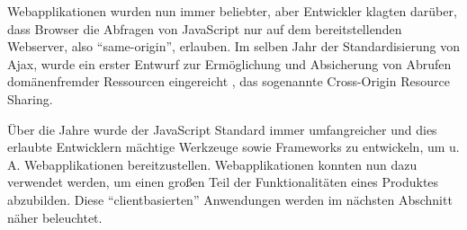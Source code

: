 Webapplikationen wurden nun immer beliebter, aber Entwickler klagten darüber, dass Browser die Abfragen von JavaScript nur auf dem bereitstellenden Webserver, also \enquote{same-origin}, erlauben\cite{CrossSiteXHRWithCORS}. Im selben Jahr der Standardisierung von Ajax, wurde ein erster Entwurf zur Ermöglichung und Absicherung von Abrufen domänenfremder Ressourcen eingereicht \cite{AuthorizingCORS}, das sogenannte Cross-Origin Resource Sharing.

Über die Jahre wurde der JavaScript Standard immer umfangreicher und dies erlaubte Entwicklern mächtige Werkzeuge sowie Frameworks zu entwickeln, um u. A. Webapplikationen bereitzustellen. Webapplikationen konnten nun dazu verwendet werden, um einen großen Teil der Funktionalitäten eines Produktes abzubilden. Diese \enquote{clientbasierten} Anwendungen werden im nächsten Abschnitt näher beleuchtet.


%
